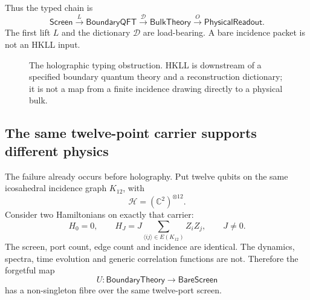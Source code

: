 \documentclass[10pt,a4paper]{article}
\theoremstyle{definition}
\theoremstyle{remark}
\begin{document}
Thus the typed chain is
\begin{equation}
\label{eq:holo-chain}
\mathsf{Screen}
\xrightarrow{\;L\;}
\mathsf{BoundaryQFT}
\xrightarrow{\;\mathcal D\;}
\mathsf{BulkTheory}
\xrightarrow{\;O\;}
\mathsf{PhysicalReadout}.
\end{equation}
The first lift \(L\) and the dictionary \(\mathcal D\) are load-bearing.  A
bare incidence packet is not an HKLL input.

\begin{figure}[htbp]
\centering
{}
\caption{The holographic typing obstruction.  HKLL is downstream of a
specified boundary quantum theory and a reconstruction dictionary; it is not a
map from a finite incidence drawing directly to a physical bulk.}
\label{fig:holochain}
\end{figure}

\subsection{The same twelve-point carrier supports different physics}

The failure already occurs before holography.  Put twelve qubits on the same
icosahedral incidence graph \(K_{12}\), with
\[
\mathcal H=(\mathbb C^2)^{\otimes 12}.
\]
Consider two Hamiltonians on exactly that carrier:
\[
H_0=0,
\qquad
H_J=J\sum_{\langle ij\rangle\in E(K_{12})}Z_iZ_j,
\qquad J\neq0.
\]
The screen, port count, edge count and incidence are identical.  The dynamics,
spectra, time evolution and generic correlation functions are not.  Therefore
the forgetful map
\[
U:\mathsf{BoundaryTheory}\to\mathsf{BareScreen}
\]
has a non-singleton fibre over the same twelve-port screen.
\end{document}
